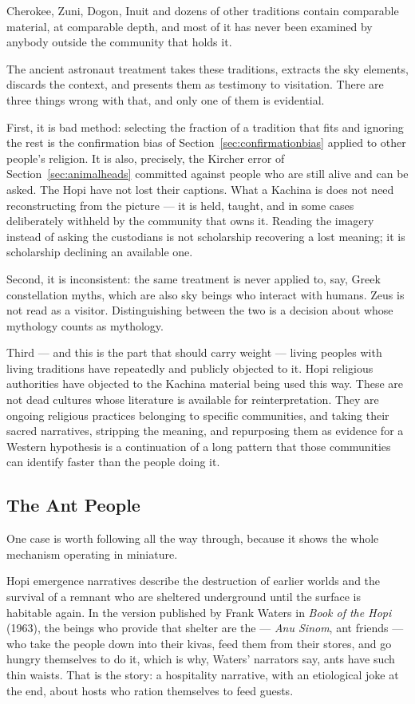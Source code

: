 Cherokee, Zuni, Dogon, Inuit and dozens of other traditions contain comparable material, at
comparable depth, and most of it has never been examined by anybody outside the community that
holds it.

The ancient astronaut treatment takes these traditions, extracts the sky elements, discards the
context, and presents them as testimony to visitation. There are three things wrong with that,
and only one of them is evidential.

First, it is bad method: selecting the fraction of a tradition that fits and ignoring the rest
is the confirmation bias of Section~\ref{sec:confirmationbias} applied to other people's religion.
It is also, precisely, the Kircher error of Section~\ref{sec:animalheads} committed against
people who are still alive and can be asked. The Hopi have not lost their captions. What a
Kachina is does not need reconstructing from the picture --- it is held, taught, and in some cases
deliberately withheld by the community that owns it. Reading the imagery instead of asking the
custodians is not scholarship recovering a lost meaning; it is scholarship declining an available
one.

Second, it is inconsistent: the same treatment is never applied to, say, Greek constellation
myths, which are also sky beings who interact with humans. Zeus is not read as a visitor.
Distinguishing between the two is a decision about whose mythology counts as mythology.

Third --- and this is the part that should carry weight --- living peoples with living
traditions have repeatedly and publicly objected to it. Hopi religious authorities have
objected to the Kachina material being used this way. These are not dead cultures whose
literature is available for reinterpretation. They are ongoing religious practices belonging to
specific communities, and taking their sacred narratives, stripping the meaning, and repurposing
them as evidence for a Western hypothesis is a continuation of a long pattern that those
communities can identify faster than the people doing it.

\subsection{The Ant People}\label{sec:antpeople}

One case is worth following all the way through, because it shows the whole mechanism operating
in miniature.

Hopi emergence narratives describe the destruction of earlier worlds and the survival of a
remnant who are sheltered underground until the surface is habitable again. In the version
published by Frank Waters in \emph{Book of the Hopi} (1963), the beings who provide that shelter
are the  --- \emph{Anu Sinom}, ant friends --- who take the people down into
their kivas, feed them from their stores, and go hungry themselves to do it, which is why, Waters'
narrators say, ants have such thin waists. That is the story: a hospitality narrative, with an
etiological joke at the end, about hosts who ration themselves to feed guests.

